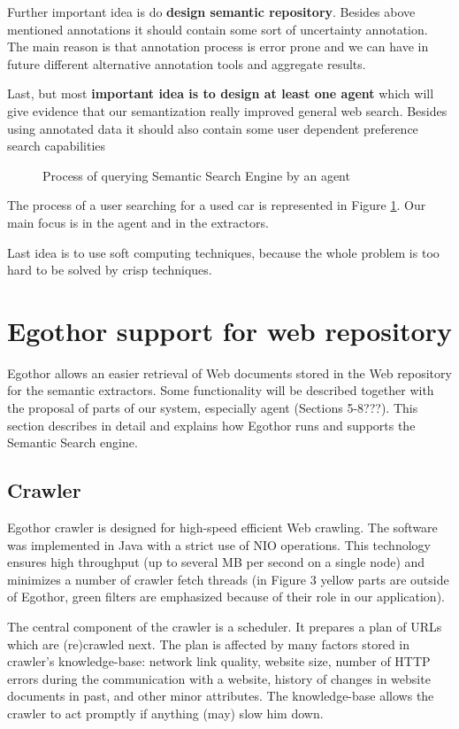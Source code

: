 \documentclass{sig-alternate}
\begin{document}
Further important idea is do \textbf{design semantic repository}. Besides above mentioned annotations it should contain some sort of uncertainty annotation. The main reason is that annotation process is error prone and we can have in future different alternative annotation tools and aggregate results. 

Last, but most \textbf{important idea is to design at least one agent} which will give evidence that our semantization really improved general web search. Besides using annotated data it should also contain some user dependent preference search capabilities


\begin{figure}
\centering
{}
\caption{Process of querying Semantic Search Engine by an agent}
\label{img:UserSearch}
\end{figure}
 
The process of a user searching for a used car is represented in Figure \ref{img:UserSearch}. Our main focus is in the agent and in the extractors. 

Last idea is to use soft computing techniques, because the whole problem is too hard to be solved by crisp techniques. 


\section{Egothor support for web repository}
Egothor allows an easier retrieval of Web documents stored in the Web repository for the semantic extractors. Some functionality will be described together with the proposal of parts of our system, especially agent (Sections 5-8???). This section describes in detail and explains how Egothor runs and supports the Semantic Search engine.

\subsection{Crawler}

Egothor crawler is designed for high-speed efficient Web crawling. The software was implemented in Java with a strict use of NIO operations. This technology ensures high throughput (up to several MB per second on a single node) and minimizes a number of crawler fetch threads (in Figure 3 yellow parts are outside of Egothor, green filters are emphasized because of their role in our application).
 
The central component of the crawler is a scheduler. It prepares a plan of URLs which are (re)crawled next.  The plan is affected by many factors stored in crawler's knowledge-base: network link quality, website size, number of HTTP errors during the communication with a website, history of changes in website documents in past, and other minor attributes. The knowledge-base allows the crawler to act promptly if anything (may) slow him down.
\end{document}
